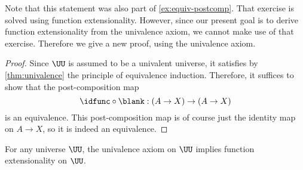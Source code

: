 Note that this statement was also part of \cref{ex:equiv-postcomp}. That exercise is solved using function extensionality. However, since our present goal is to derive function extensionality from the univalence axiom, we cannot make use of that exercise. Therefore we give a new proof, using the univalence axiom.

\begin{proof}
  Since $\UU$ is assumed to be a univalent universe, it satisfies by \cref{thm:univalence} the principle of equivalence induction. Therefore, it suffices to show that the post-composition map
  \begin{equation*}
    \idfunc\circ\blank : (A\to X)\to (A\to X)
  \end{equation*}
  is an equivalence. This post-composition map is of course just the identity map on $A\to X$, so it is indeed an equivalence.
\end{proof}

\begin{thm}\label{thm:funext-univalence}
  For any universe $\UU$, the univalence axiom on $\UU$ implies function extensionality on $\UU$.
\end{thm}

